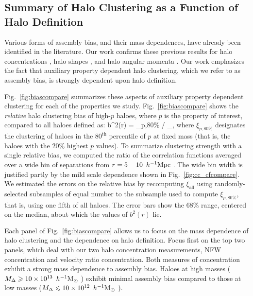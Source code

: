 \documentclass[usenatbib,fleqn]{mnras}
\begin{document}
\subsection{Summary of Halo Clustering as a Function of Halo Definition}

Various forms of assembly bias, and their mass dependences, have already been identified in the literature. Our work confirms these previous results for halo concentrations \citep{wechsler_etal06,faltenbacher_white10,mao_etal15, sunayama_etal16}, halo shapes \citep{bett_etal07,hahn_etal07b,hahn_etal07b,faltenbacher_white10,vandaalen_etal12}, and halo angular momenta \citep{bett_etal07,hahn_etal07a,hahn_etal07b}. Our work emphasizes the fact that auxiliary property dependent halo clustering, which we refer to as assembly bias, is strongly dependent upon halo definition. 

Fig.~\ref{fig:biascompare} summarizes these aspects of auxiliary property dependent clustering for each of the properties we study. Fig.~\ref{fig:biascompare} shows the {\em relative} halo clustering bias of high-$p$ haloes, where $p$ is the property of interest, compared to all haloes defined as: 
\beq
b^2(r) = \xi_{p,80\%} / \xi_{},
\eeq
%
where $\xi_{p,80\%}$ designates the clustering of haloes in the $80^{\mathrm{th}}$ percentile of $p$ at fixed mass (that is, the haloes with the $20\%$ highest $p$ values). To summarize clustering strength with a single relative bias, we computed the ratio of the correlation functions averaged over a wide bin of separations from $r = 5-10\, \ h^{-1}\mathrm{Mpc}~$. The wide bin width is justified partly by the mild scale dependence shown in Fig.~\ref{fig:cc_cfcompare}. We estimated the errors on the relative bias by recomputing $\xi_{\mathrm{all}}$ using randomly-selected subsamples of equal number to the subsample used to compute $\xi_{p,80\%}$, that is, using one fifth of all haloes. The error bars show the $68\%$ range, centered on the median, about which the values of $b^2(r)$ lie. 

Each panel of Fig.~\ref{fig:biascompare} allows us to focus on the mass dependence of halo clustering and the dependence on halo definition. Focus first on the top two panels, which deal with our two halo concentration measurements, NFW concentration and velocity ratio concentration. Both measures of concentration exhibit a strong mass dependence to assembly bias. Haloes at high masses ($M_{\Delta} \geqslant 10\times10^{13}\, \ h^{-1}\mathrm{M}_{\odot}~$) exhibit minimal assembly bias compared to those at low masses ($M_{\Delta} \leqslant 10\times10^{12}\, \ h^{-1}\mathrm{M}_{\odot}~$). 
\end{document}
